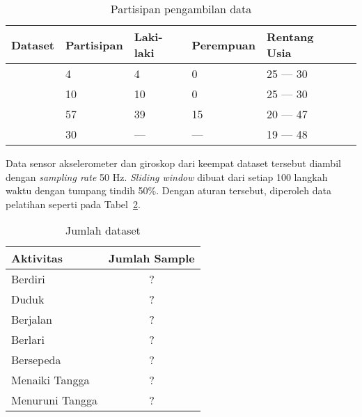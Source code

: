 \begin{table}[h!]
    \centering
    \caption{Partisipan pengambilan data}
    \begin{tabular}{ |l|l|l|l|l|l| }
        \hline
        \textbf{Dataset} & \textbf{Partisipan} & \textbf{Laki-laki} & \textbf{Perempuan} & \textbf{Rentang Usia} \\

        \hline
        \citet{shoaib-2013} & 4 & 4 & 0 & 25 --- 30 \\

        \hline
        \citet{shoaib-2014} & 10 & 10 & 0 & 25 --- 30 \\

        \hline
        \citet{vavoulas-2016} & 57 & 39 & 15 & 20 --- 47 \\

        \hline
        \citet{anguita-2013} & 30 & --- & --- & 19 --- 48 \\

        \hline
    \end{tabular}
    \label{table:partisipan-dataset}
\end{table}

Data sensor akselerometer dan giroskop dari keempat dataset tersebut diambil dengan \textit{sampling rate} 50 Hz. \textit{Sliding window} dibuat dari setiap 100 langkah waktu dengan tumpang tindih 50\%. Dengan aturan tersebut, diperoleh data pelatihan seperti pada Tabel~\ref{table:jumlah-dataset}.

\begin{table}[h!]
    \centering
    \caption{Jumlah dataset}
    \begin{tabular}{ |l|c| }
        \hline
        \textbf{Aktivitas} & \textbf{Jumlah Sample} \\

        \hline
        Berdiri & ? \\

        \hline
        Duduk & ? \\

        \hline
        Berjalan & ? \\

        \hline
        Berlari & ? \\

        \hline
        Bersepeda & ? \\

        \hline
        Menaiki Tangga & ? \\

        \hline
        Menuruni Tangga & ? \\

        \hline
    \end{tabular}
    \label{table:jumlah-dataset}
\end{table}

